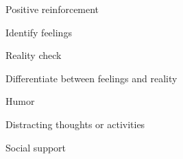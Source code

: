 \documentclass[aspectratio=169]{beamer}
\begin{document}
\begin{frame}
  \begin{center}
    \Huge Positive reinforcement
    \\ \small \cite{hh15}
  \end{center}
\end{frame}

\begin{frame}
  \begin{center}
    \Huge Identify feelings
    \\ \small \cite{caltech}
  \end{center}
\end{frame}

\begin{frame}
  \begin{center}
    \Huge Reality check
    \\ \small \cite{caltech}
  \end{center}
\end{frame}

\begin{frame}
  \begin{center}
    \Huge Differentiate between feelings and reality
    \\ \small \cite{caltech}
  \end{center}
\end{frame}

\begin{frame}
  \begin{center}
    \Huge Humor
    \\ \small \cite{hh15}
  \end{center}
\end{frame}

\begin{frame}
  \begin{center}
    \Huge Distracting thoughts or activities
    \\ \small \cite{hh15}
  \end{center}
\end{frame}

\begin{frame}
  \begin{center}
    \Huge Social support
    \\ \small \cite{caltech}
  \end{center}
\end{frame}
\end{document}
